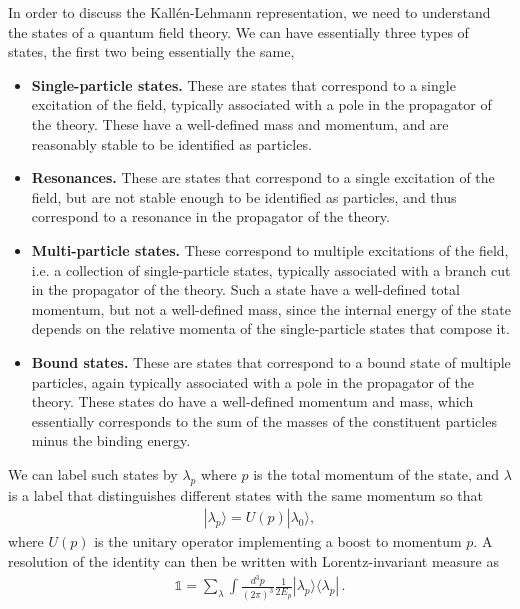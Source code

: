 \documentclass[../QFT_main.tex]{subfiles}
\begin{document}
\begin{mytheorem}
In order to discuss the Kallén-Lehmann representation, we need to understand the states of a quantum field theory.
We can have essentially three types of states, the first two being essentially the same,
\begin{itemize}
    \item \textbf{Single-particle states.} These are states that correspond to a single excitation of the field, typically associated with a pole in the propagator of the theory.
    These have a well-defined mass and momentum, and are reasonably stable to be identified as particles.
    \item \textbf{Resonances.} These are states that correspond to a single excitation of the field, but are not stable enough to be identified as particles, and thus correspond to a resonance in the propagator of the theory.
    \item \textbf{Multi-particle states.} These correspond to multiple excitations of the field, i.e. a collection of single-particle states, typically associated with a branch cut in the propagator of the theory.
    Such a state have a well-defined total momentum, but not a well-defined mass, since the internal energy of the state depends on the relative momenta of the single-particle states that compose it.
    \item \textbf{Bound states.} These are states that correspond to a bound state of multiple particles, again typically associated with a pole in the propagator of the theory.
    These states do have a well-defined momentum and mass, which essentially corresponds to the sum of the masses of the constituent particles minus the binding energy.
\end{itemize}

We can label such states by $\lambda_p$ where $p$ is the total momentum of the state, and $\lambda$ is a label that distinguishes different states with the same momentum so that
\begin{align}
    |\lambda_p\rangle = U(p)|\lambda_0\rangle,
\end{align}
where $U(p)$ is the unitary operator implementing a boost to momentum $p$.
A resolution of the identity can then be written with Lorentz-invariant measure as
\begin{align}
    \mathbb{1} = \sum_\lambda \int \frac{d^3p}{(2\pi)^3}\frac{1}{2E_p}|\lambda_p\rangle\langle\lambda_p|\,.
\end{align}
\end{mytheorem}
\end{document}
